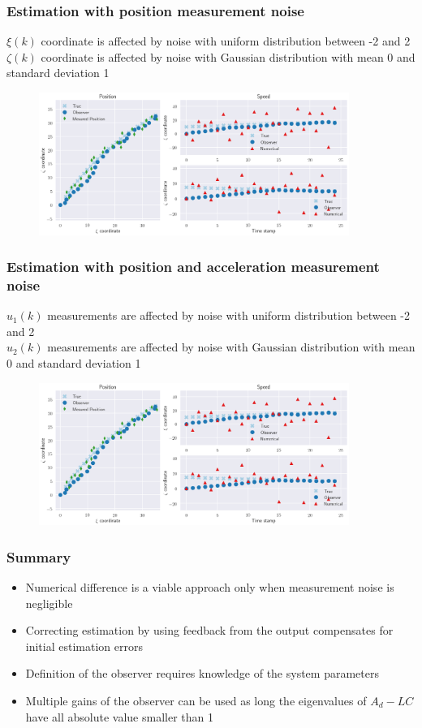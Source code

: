 \begin{frame}
	\frametitle{Estimation with position measurement noise}
	$\xi(k)$ coordinate is affected by noise with uniform distribution between -2 and 2\\
	$\zeta(k)$ coordinate is affected by noise with Gaussian distribution with mean 0 and standard deviation 1
	\begin{figure}[b]
		\includegraphics[width=0.9\textwidth]{fig/observer_ex_2}
	\end{figure}
\end{frame}

\begin{frame}
	\frametitle{Estimation with position and acceleration measurement noise}
	$u_1(k)$ measurements are affected by noise with uniform distribution between -2 and 2\\
	$u_2(k)$ measurements are affected by noise with Gaussian distribution with mean 0 and standard deviation 1
	\begin{figure}
		\includegraphics[width=0.9\textwidth]{fig/observer_ex_3}
	\end{figure}
\end{frame}

\begin{frame}
	\frametitle{Summary}
	\begin{itemize}
		\setlength\itemsep{1.5em}
		\item Numerical difference is a viable approach only when measurement noise is negligible
		\item Correcting estimation by using feedback from the output compensates for initial estimation errors
		\item Definition of the observer requires knowledge of the system parameters
		\item Multiple gains of the observer can be used as long the eigenvalues of $A_d-LC$ have all absolute value smaller than 1
	\end{itemize}

\end{frame}